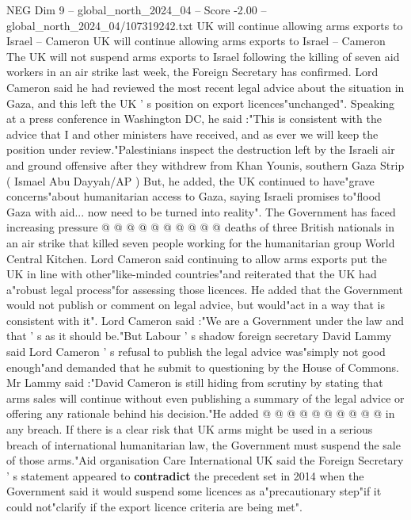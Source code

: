 \begin{textsample}{NEG Dim 9 – global\_north\_2024\_04 – Score -2.00 – global\_north\_2024\_04/107319242.txt}  \label{ex:f9_neg_216}
UK will continue allowing arms exports to Israel -- Cameron UK will continue allowing arms exports to Israel -- Cameron The UK will not suspend arms exports to Israel following the killing of seven aid workers in an air strike last week, the Foreign Secretary has confirmed.
Lord Cameron said he had reviewed the most recent legal advice about the situation in Gaza, and this left the UK ' s position on export licences"unchanged".
Speaking at a press conference in Washington DC, he said :"This is consistent with the advice that I and other ministers have received, and as ever we will keep the position under review."Palestinians inspect the destruction left by the Israeli air and ground offensive after they withdrew from Khan Younis, southern Gaza Strip ( Ismael Abu Dayyah/AP ) But, he added, the UK continued to have"grave concerns"about humanitarian access to Gaza, saying Israeli promises to"flood Gaza with aid... now need to be turned into reality".
The Government has faced increasing pressure @ @ @ @ @ @ @ @ @ @ deaths of three British nationals in an air strike that killed seven people working for the humanitarian group World Central Kitchen.
Lord Cameron said continuing to allow arms exports put the UK in line with other"like-minded countries"and reiterated that the UK had a"robust legal process"for assessing those licences.
He added that the Government would not publish or comment on legal advice, but would"act in a way that is consistent with it".
Lord Cameron said :"We are a Government under the law and that ' s as it should be."But Labour ' s shadow foreign secretary David Lammy said Lord Cameron ' s refusal to publish the legal advice was"simply not good enough"and demanded that he submit to questioning by the House of Commons.
Mr Lammy said :"David Cameron is still hiding from scrutiny by stating that arms sales will continue without even publishing a summary of the legal advice or offering any rationale behind his decision."He added @ @ @ @ @ @ @ @ @ @ in any breach.
If there is a clear risk that UK arms might be used in a serious breach of international humanitarian law, the Government must suspend the sale of those arms."Aid organisation Care International UK said the Foreign Secretary ' s statement appeared to \textbf{contradict} the precedent set in 2014 when the Government said it would suspend some licences as a"precautionary step"if it could not"clarify if the export licence criteria are being met".

\end{textsample}
